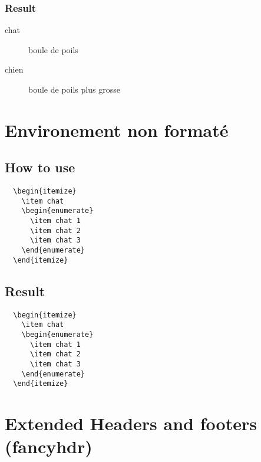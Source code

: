 \documentclass[a4paper,12pt]{article}
\begin{document}
\subsubsection{Result}

\begin{description}
  \item[chat] boule de poils
  \item[chien] boule de poils plus grosse
\end{description}


\newpage
\section{Environement non formaté}
\subsection{How to use}
\begin{verbatim}
  \begin{itemize}
    \item chat
    \begin{enumerate}
      \item chat 1
      \item chat 2
      \item chat 3
    \end{enumerate}
  \end{itemize}
\end{verbatim}
\subsection{Result}
\begin{verbatim}
  \begin{itemize}
    \item chat
    \begin{enumerate}
      \item chat 1
      \item chat 2
      \item chat 3
    \end{enumerate}
  \end{itemize}
\end{verbatim}


\newpage
\section{Extended Headers and footers (fancyhdr)}
\end{document}
